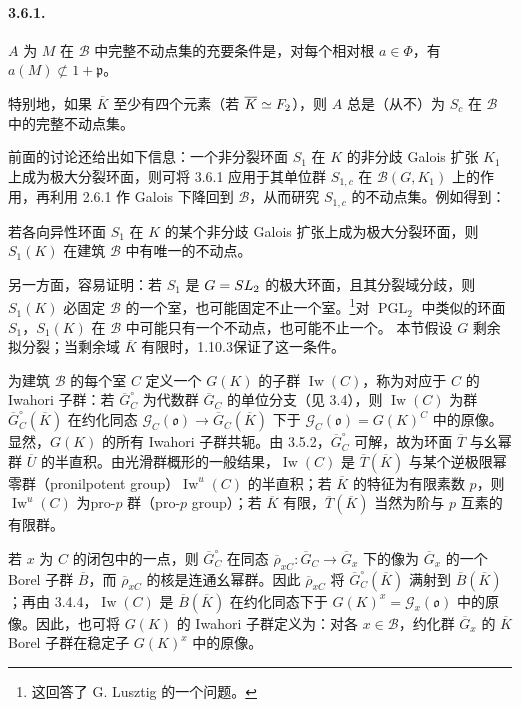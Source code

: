 \paragraph*{3.6.1.}$A$ 为 $M$ 在 $\mathscr B$ 中完整不动点集的充要条件是，对每个相对根 $a\in\Phi$，有 $a(M)\not\subset1+\mathfrak p$。

特别地，如果 $\overline K$ 至少有四个元素（若 $\overline K\simeq F_2$），则 $A$ 总是（从不）为 $S_c$ 在 $\mathscr B$ 中的完整不动点集。

前面的讨论还给出如下信息：一个非分裂环面 $S_1$ 在 $K$ 的非分歧 Galois 扩张 $K_1$ 上成为极大分裂环面，则可将 3.6.1 应用于其单位群 $S_{1,c}$ 在 $\mathscr B(G,K_1)$ 上的作用，再利用 2.6.1 作 Galois 下降回到 $\mathscr B$，从而研究 $S_{1,c}$ 的不动点集。例如得到：

若各向异性环面 $S_1$ 在 $K$ 的某个非分歧 Galois 扩张上成为极大分裂环面，则 $S_1(K)$ 在建筑 $\mathscr B$ 中有唯一的不动点。

另一方面，容易证明：若 $S_1$ 是 $G=SL_2$ 的极大环面，且其分裂域分歧，则 $S_1(K)$ 必固定 $\mathscr B$ 的一个室，也可能固定不止一个室。\footnote{这回答了 G. Lusztig 的一个问题。}对 $\operatorname{PGL}_2$ 中类似的环面 $S_1$，$S_1(K)$ 在 $\mathscr B$ 中可能只有一个不动点，也可能不止一个。
本节假设 $G$ 剩余拟分裂；当剩余域 $\overline K$ 有限时，1.10.3保证了这一条件。

为建筑 $\mathscr B$ 的每个室 $C$ 定义一个 $G(K)$ 的子群 $\operatorname{Iw}(C)$，称为对应于 $C$ 的 Iwahori 子群：若 $\overline G_C^\circ$ 为代数群 $\overline G_C$ 的单位分支（见 3.4），则 $\operatorname{Iw}(C)$ 为群 $\overline G_C^\circ(\overline K)$ 在约化同态 $\mathscr G_C(\mathfrak o)\to\overline G_C(\overline K)$ 下于 $\mathscr G_C(\mathfrak o)=G(K)^C$ 中的原像。显然，$G(K)$ 的所有 Iwahori 子群共轭。由 3.5.2，$\overline G_C^\circ$ 可解，故为环面 $\overline T$ 与幺幂群 $\overline U$ 的半直积。由光滑群概形的一般结果，$\operatorname{Iw}(C)$ 是 $\overline T(\overline K)$ 与某个逆极限幂零群（pronilpotent group）$\operatorname{Iw}^u(C)$ 的半直积；若 $\overline K$ 的特征为有限素数 $p$，则 $\operatorname{Iw}^u(C)$ 为pro-$p$ 群（pro-$p$ group）；若 $\overline K$ 有限，$\overline T(\overline K)$ 当然为阶与 $p$ 互素的有限群。

若 $x$ 为 $C$ 的闭包中的一点，则 $\overline G_C^\circ$ 在同态 $\overline\rho_{xC}:\overline G_C\to\overline G_x$ 下的像为 $\overline G_x$ 的一个 Borel 子群 $\overline B$，而 $\overline\rho_{xC}$ 的核是连通幺幂群。因此 $\overline\rho_{xC}$ 将 $\overline G_C^\circ(\overline K)$ 满射到 $\overline B(\overline K)$；再由 3.4.4，$\operatorname{Iw}(C)$ 是 $\overline B(\overline K)$ 在约化同态下于 $G(K)^x=\mathscr G_x(\mathfrak o)$ 中的原像。因此，也可将 $G(K)$ 的 Iwahori 子群定义为：对各 $x\in\mathscr B$，约化群 $\overline G_x$ 的 $\overline K$ Borel 子群在稳定子 $G(K)^x$ 中的原像。

